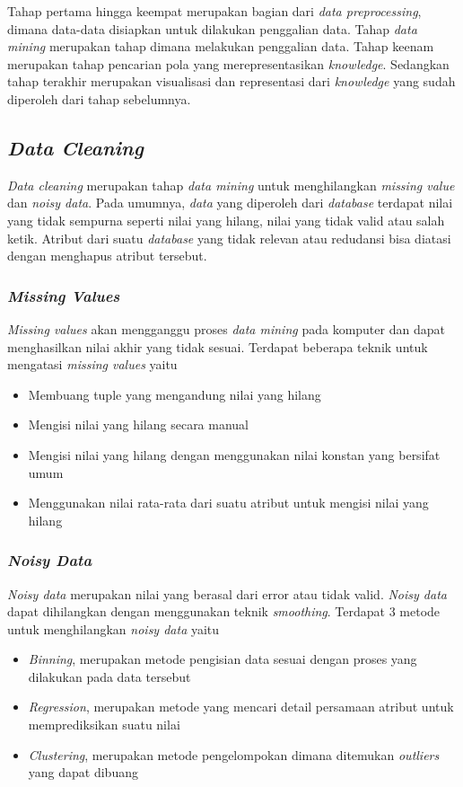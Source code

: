 Tahap pertama hingga keempat merupakan bagian dari \textsl{data preprocessing}, dimana data-data disiapkan untuk dilakukan penggalian data. Tahap \textsl{data mining} merupakan tahap dimana melakukan penggalian data. Tahap keenam merupakan tahap pencarian pola yang merepresentasikan \textsl{knowledge}. Sedangkan tahap terakhir merupakan visualisasi dan representasi dari \textsl{knowledge} yang sudah diperoleh dari tahap sebelumnya.


\subsection{\textsl{Data Cleaning}}
\textsl{Data cleaning} merupakan tahap \textsl{data mining} untuk menghilangkan \textsl{missing value} dan \textsl{noisy data}. Pada umumnya, \textsl{data} yang diperoleh dari \textsl{database} terdapat nilai yang tidak sempurna seperti nilai yang hilang, nilai yang tidak valid atau salah ketik. Atribut dari suatu \textsl{database} yang tidak relevan atau redudansi bisa diatasi dengan menghapus atribut tersebut. 

\subsubsection{\textsl{Missing Values}}
\textsl{Missing values} akan mengganggu proses \textsl{data mining} pada komputer dan dapat menghasilkan nilai akhir yang tidak sesuai. Terdapat beberapa teknik untuk mengatasi \textsl{missing values} yaitu
	\begin{itemize}
		\item Membuang tuple yang mengandung nilai yang hilang\textit{\textit{}}
		\item Mengisi nilai yang hilang secara manual
		\item Mengisi nilai yang hilang dengan menggunakan nilai konstan yang bersifat umum
		\item Menggunakan nilai rata-rata dari suatu atribut untuk mengisi nilai yang hilang
	\end{itemize}
\subsubsection{\textsl{Noisy Data}}
\textsl{Noisy data} merupakan nilai yang berasal dari error atau tidak valid. \textsl{Noisy data} dapat dihilangkan dengan menggunakan teknik \textsl{smoothing}. Terdapat 3 metode untuk menghilangkan \textsl{noisy data} yaitu
	\begin{itemize}
		\item \textsl{Binning}, merupakan metode pengisian data sesuai dengan proses yang dilakukan pada data tersebut
		\item \textsl{Regression}, merupakan metode yang mencari detail persamaan atribut untuk memprediksikan suatu nilai
		\item	\textsl{Clustering}, merupakan metode pengelompokan dimana ditemukan \textsl{outliers} yang dapat dibuang
	\end{itemize}

